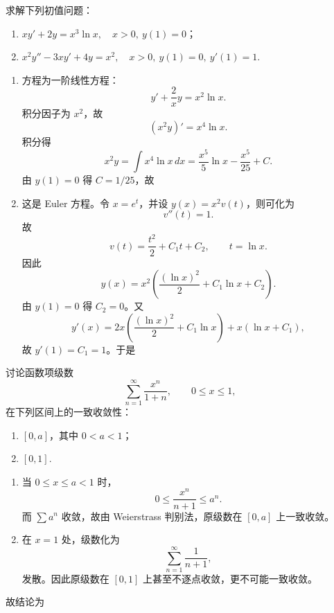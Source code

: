 ﻿


\begin{question}
求解下列初值问题：
\begin{enumerate}[label=（\arabic*）,leftmargin=2.8em,itemsep=0.2em]
\item $xy'+2y=x^3\ln x,\quad x>0,\ y(1)=0$；
\item $x^2y''-3xy'+4y=x^2,\quad x>0,\ y(1)=0,\ y'(1)=1$.
\end{enumerate}
\begin{solution}

\begin{enumerate}[label=（\arabic*）,leftmargin=2.8em,itemsep=0.2em]
\item 方程为一阶线性方程：
\[
y'+\frac{2}{x}y=x^2\ln x.
\]
积分因子为 $x^2$，故
\[
(x^2y)'=x^4\ln x.
\]
积分得
\[
x^2y=\int x^4\ln x\,dx=
\frac{x^5}{5}\ln x-\frac{x^5}{25}+C.
\]
由 $y(1)=0$ 得 $C=1/25$，故

\item 这是 Euler 方程。令 $x=e^t$，并设 $y(x)=x^2v(t)$，则可化为
\[
v''(t)=1.
\]
故
\[
v(t)=\frac{t^2}{2}+C_1t+C_2,
\qquad t=\ln x.
\]
因此
\[
y(x)=x^2\left(\frac{(\ln x)^2}{2}+C_1\ln x+C_2\right).
\]
由 $y(1)=0$ 得 $C_2=0$。又
\[
y'(x)=2x\left(\frac{(\ln x)^2}{2}+C_1\ln x\right)+x(\ln x+C_1),
\]
故 $y'(1)=C_1=1$。于是
\end{enumerate}
\end{solution}
\end{question}

\begin{question}
讨论函数项级数
\[
\sum_{n=1}^{\infty}\frac{x^n}{1+n},
\qquad 0\le x\le 1,
\]
在下列区间上的一致收敛性：
\begin{enumerate}[label=（\arabic*）,leftmargin=2.8em,itemsep=0.2em]
\item $[0,a]$，其中 $0<a<1$；
\item $[0,1]$.
\end{enumerate}
\begin{solution}

\begin{enumerate}[label=（\arabic*）,leftmargin=2.8em,itemsep=0.2em]
\item 当 $0\le x\le a<1$ 时，
\[
0\le \frac{x^n}{n+1}\le a^n.
\]
而 $\sum a^n$ 收敛，故由 Weierstrass 判别法，原级数在 $[0,a]$ 上一致收敛。

\item 在 $x=1$ 处，级数化为
\[
\sum_{n=1}^{\infty}\frac1{n+1},
\]
发散。因此原级数在 $[0,1]$ 上甚至不逐点收敛，更不可能一致收敛。
\end{enumerate}
故结论为
\end{solution}
\end{question}

